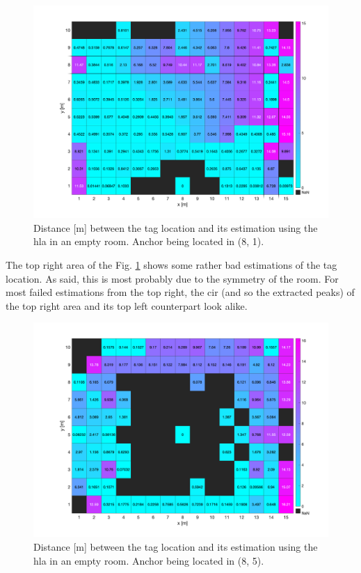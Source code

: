 \begin{figure}[H]
\centering
\includegraphics[width=.9\linewidth]{Images/hla_images/anchor_(8_1).png}
\caption{Distance [m] between the tag location and its estimation using the \gls{hla} in an empty room. Anchor being located in (8, 1).\label{fig:hla_empty_2}}
\end{figure}

The top right area of the Fig. \ref{fig:hla_empty_2} shows some rather bad estimations of the tag location. As said, this is most probably due to the symmetry of the room. For most failed estimations from the top right, the \gls{cir} (and so the extracted peaks) of the top right area and its top left counterpart look alike.

\begin{figure}[H]
\centering
\includegraphics[width=.9\linewidth]{Images/hla_images/anchor_(8_5).png}
\caption{Distance [m] between the tag location and its estimation using the \gls{hla} in an empty room. Anchor being located in (8, 5). \label{fig:hla_empty_3}}
\end{figure}

